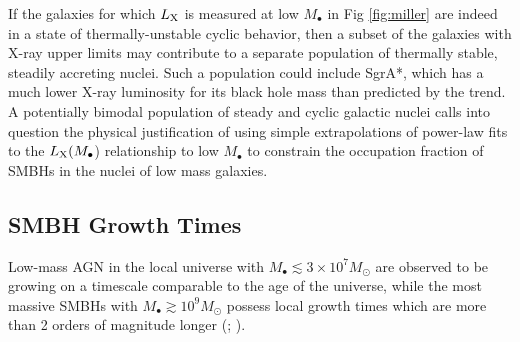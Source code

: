 \documentclass[usenatbib,fleqn]{mn2e}
\begin{document}
If the galaxies for which $L_{\rm X}$ is measured at low $M_{\bullet}$
in Fig \ref{fig:miller} are indeed in a state of thermally-unstable
cyclic behavior, then a subset of the galaxies with X-ray upper limits
may contribute to a separate population of thermally stable, steadily
accreting nuclei.  Such a population could include SgrA*, which has a
much lower X-ray luminosity for its black hole mass than predicted by
the \citet{Miller+15} trend.  A potentially bimodal population of
steady and cyclic galactic nuclei calls into question the physical
justification of using simple extrapolations of power-law fits to the
$L_{\rm X}(M_{\bullet}$) relationship to low $M_{\bullet}$ to
constrain the occupation fraction of SMBHs in the nuclei of low mass
galaxies.

  


\subsection{SMBH Growth Times }
\label{sec:growth}

Low-mass AGN in the local universe with $M_{\bullet} \lesssim 3\times
10^{7}M_{\odot}$ are observed to be growing on a timescale comparable
to the age of the universe, while the most massive SMBHs with
$M_{\bullet} \gtrsim 10^{9}M_{\odot}$ possess local growth times which
are more than 2 orders of magnitude longer (\citealt{Heckman+04};
\citealt{Kauffmann&Heckman09}).
\end{document}
